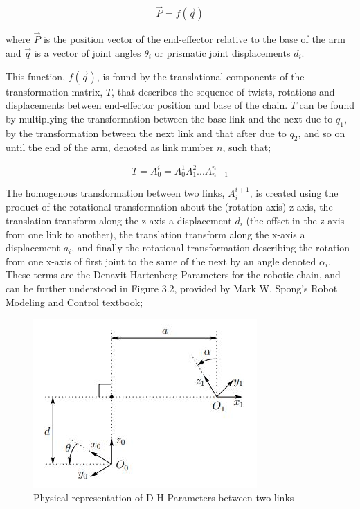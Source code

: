 \documentclass[12pt,openany,a4paper]{book}
\begin{document}
\vspace{\baselineskip}
\begin{equation}
\vec{P} = f( \vec{q} )
\end{equation}

\vspace{\baselineskip}
where $\vec{P}$ is the position vector of the end-effector relative to the base of the arm and $\vec{q}$ is a vector of joint angles $\theta_i$ or prismatic joint displacements $d_i$.

This function, $f(\vec{q})$, is found by the translational components of the transformation matrix, $T$, that describes the sequence of twists, rotations and displacements between end-effector position and base of the chain. $T$ can be found by multiplying the transformation between the base link and the next due to $q_1$, by the transformation between the next link and that after due to $q_2$, and so on until the end of the arm, denoted as link number $n$, such that;

\vspace{\baselineskip}
\begin{equation}
T = A_{0}^i = A_{0}^{1} A_{1}^{2} ... A_{n-1}^n
\end{equation}

\vspace{\baselineskip}
The homogenous transformation between two links, $A_{i}^{i+1}$, is created using the product of the rotational transformation about the (rotation axis) z-axis, the translation transform along the z-axis a displacement $d_i$ (the offset in the z-axis from one link to another), the translation transform along the x-axis a displacement $a_i$, and finally the rotational transformation describing the rotation from one x-axis of first joint to the same of the next by an angle denoted $\alpha_i$. These terms are the Denavit-Hartenberg Parameters for the robotic chain, and can be further understood in Figure 3.2, provided by Mark W. Spong's Robot Modeling and Control textbook;

\begin{center}
\begin{figure}[htb]
  \includegraphics[width=0.6\linewidth]{DH_Parameters_figure.jpg}
\caption{Physical representation of D-H Parameters between two links}
\end{figure}
\end{center}
\end{document}
